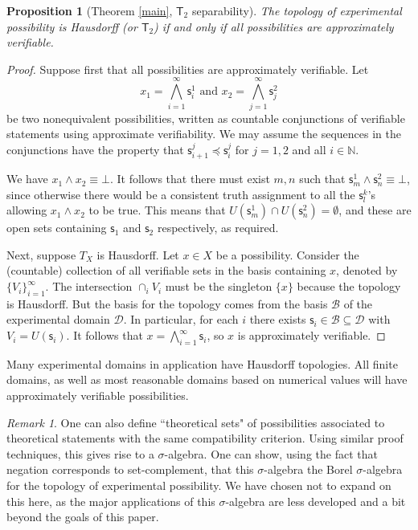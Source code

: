 \documentclass[psamsfonts]{amsart}
\newtheorem{prop}[thm]{Proposition}
\theoremstyle{definition}
\theoremstyle{remark}
\newtheorem{rem}[thm]{Remark}
\numberwithin{equation}{section}
\newcommand{\N}{\mathbb{N}}
\def\contradiction{\bot}
\def\narrower{\preccurlyeq}
\def\AND{\wedge}
\def\bigAND{\bigwedge}
\newcommand{\stmt}[1][s] {\mathsf{#1}}
\newcommand{\obs}[1][s] {\mathsf{#1}}
\newcommand{\edomain}[1][D] {\mathcal{#1}}
\newcommand{\basis}[1][B] {\mathcal{#1}} %
\begin{document}
\begin{prop}[Theorem \ref{main}, $\mathsf{T}_2$ separability]
The topology of experimental possibility is Hausdorff (or $\mathsf{T}_2$) if and only if all possibilities are approximately verifiable.
\end{prop}
\begin{proof}
Suppose first that all possibilities are approximately verifiable. Let $$x_1=\bigAND\limits_{i=1}^\infty \obs_i^1\text{ and }x_2=\bigAND\limits_{j=1}^\infty \obs_j^2$$ be two nonequivalent possibilities, written as countable conjunctions of verifiable statements using approximate verifiability. We may assume the sequences in the conjunctions have the property that $\stmt^j_{i+1}\narrower\stmt^j_i$ for $j=1,2$ and all $i\in\N$. 

We have $x_1\AND x_2\equiv\contradiction$. It follows that there must exist $m,n$ such that $\stmt^1_m\AND\stmt^2_n\equiv\contradiction$, since otherwise there would be a consistent truth assignment to all the $\stmt^k_l$'s allowing $x_1\AND x_2$ to be true. This means that $U(\stmt^1_m)\cap U(\stmt^2_n)=\emptyset$, and these are open sets containing $\stmt_1$ and $\stmt_2$ respectively, as required. 

Next, suppose $T_X$ is Hausdorff. Let $x\in X$ be a possibility. Consider the (countable) collection of all verifiable sets in the basis containing $x$, denoted by $\{V_i\}_{i=1}^{\infty}$. The intersection $\cap_iV_i$ must be the singleton $\{x\}$ because the topology is Hausdorff. But the basis for the topology comes from the basis $\basis$ of the experimental domain $\edomain$. In particular, for each $i$ there exists $\stmt_i\in\basis\subseteq\edomain$ with $V_i=U(\stmt_i)$. It follows that $x=\bigAND\limits_{i=1}^{\infty}\stmt_i$, so $x$ is approximately verifiable. 
\end{proof}

Many experimental domains in application have Hausdorff topologies. All finite domains, as well as most reasonable domains based on numerical values will have approximately verifiable possibilities. 

\begin{rem}
One can also define ``theoretical sets" of possibilities associated to theoretical statements with the same compatibility criterion. Using similar proof techniques, this gives rise to a $\sigma$-algebra. One can show, using the fact that negation corresponds to set-complement, that this $\sigma$-algebra the Borel $\sigma$-algebra for the topology of experimental possibility. We have chosen not to expand on this here, as the major applications of this $\sigma$-algebra are less developed and a bit beyond the goals of this paper. 
\end{rem}
\end{document}
